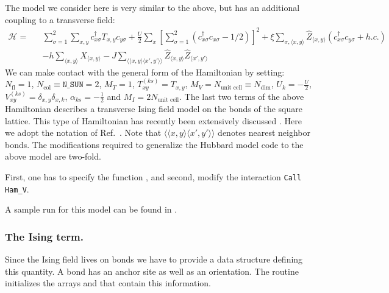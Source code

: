 The model we consider here  is very similar to the  above,  but has an additional coupling to a transverse field: 
\begin{eqnarray}
\label{eqn_hubbard_sun_Ising}
\mathcal{H}= & & 
\sum\limits_{\sigma=1}^{2} 
\sum\limits_{x,y } 
  c^{\dagger}_{x \sigma} T_{x,y}c^{\phantom\dagger}_{y \sigma} 
+ \frac{U}{2}\sum\limits_{x}\left[
\sum\limits_{\sigma=1}^{2}
\left(  c^{\dagger}_{x \sigma} c^{\phantom\dagger}_{x \sigma}  -1/2 \right) \right]^{2}   
+  \xi \sum_{\sigma,\langle x,y \rangle} \hat{Z}_{\langle x,y \rangle}  \left( c^{\dagger}_{x \sigma} c^{\phantom\dagger}_{y \sigma}  + h.c. \right)  \nonumber \\ 
 & & - h \sum_{\langle x,y \rangle} \hat{X}_{\langle x,y \rangle}   - J \sum_{\langle \langle x,y \rangle \langle x',y' \rangle \rangle} 
  \hat{Z}_{\langle x,y \rangle}   \hat{Z}_{\langle x',y' \rangle} 
\end{eqnarray}
We can make contact with the general form of the Hamiltonian by setting: 
$N_{\mathrm{fl}} = 1$, $N_{\mathrm{col}} \equiv \texttt{N\_SUN}     =2 $,   $M_T    =    1$,  $T^{(ks)}_{x y}   =  T_{x,y}$,  $M_V   =  N_{\text{unit cell}} \equiv N_{\mathrm{dim}}$,  $U_{k}       =   -\frac{U}{2}$, 
 $V_{x y}^{(ks)} =  \delta_{x,y} \delta_{x,k}$,  $\alpha_{ks}   = - \frac{1}{2}  $ and $M_I       = 2 N_{\text{unit cell}} $.  
 The last two terms of the  above Hamiltonian describes a  transverse Ising field model on the bonds of the square lattice.  This  type of Hamiltonian  has  recently been extensively discussed  \cite{Schattner15,Xu16,Assaad16}.  Here we adopt the notation of Ref.~\cite{Assaad16}. Note that   $\langle \langle x,y \rangle \langle x',y' \rangle \rangle $ denotes nearest neighbor bonds.
The modifications  required to generalize the Hubbard model code to the above model are two-fold. 

First,  one has to specify the function , and  second,  modify the interaction \texttt{Call Ham\_V}.

A sample run for this model can be found in .


\subsubsection{The Ising term.}
Since the Ising field lives on bonds we have to provide a data structure defining this quantity.  A bond has an anchor site as well as an orientation. The routine    initializes  the arrays  and   that contain this information. 


